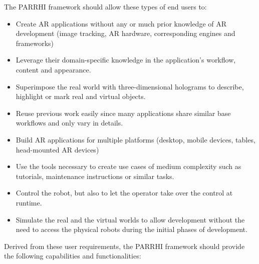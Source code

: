 The PARRHI framework should allow these types of end users to:
\begin{itemize}
	\setlength\itemsep{-1em}
	\item Create AR applications without any or much prior knowledge of AR development (image tracking, AR hardware, corresponding engines and frameworks)
	\item Leverage their domain-specific knowledge in the application's workflow, content and appearance.
	\item Superimpose the real world with three-dimensional holograms to describe, highlight or mark real and virtual objects.
	\item Reuse previous work easily since many applications share similar base workflows and only vary in details.
	\item Build AR applications for multiple platforms (desktop, mobile devices, tables, head-mounted AR devices) 
	\item Use the tools necessary to create use cases of medium complexity such as tutorials, maintenance instructions or similar tasks.
	\item Control the robot, but also to let the operator take over the control at runtime.
	\item Simulate the real and the virtual worlds to allow development without the need to access the physical robots during the initial phases of development. 
\end{itemize}

Derived from these user requirements, the PARRHI framework should provide the following capabilities and functionalities:

